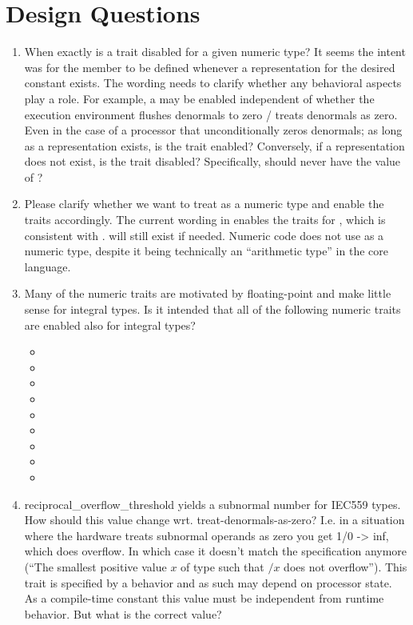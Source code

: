 \section{Design Questions}
\begin{enumerate}
  \item When exactly is a trait disabled for a given numeric type?
  It seems the intent was for the  member to be defined whenever a representation for the desired constant exists.
  The wording needs to clarify whether any behavioral aspects play a role.
  For example, a  may be enabled independent of whether the execution environment flushes denormals to zero / treats denormals as zero.
  Even in the case of a processor that unconditionally zeros denormals; as long as a representation exists, is the trait enabled?
  Conversely, if a representation does not exist, is the trait disabled?
  Specifically,  should never have the value of ?

  \item Please clarify whether we want to treat  as a numeric type and enable the traits accordingly.
  The current wording in \cite{P1841R2} enables the traits for , which is consistent with .
   will still exist if needed.
  Numeric code does not use  as a numeric type, despite it being technically an “arithmetic type” in the core language.

  \item Many of the numeric traits are motivated by floating-point and make little sense for integral types.
  Is it intended that all of the following numeric traits are enabled also for integral types?
  \begin{itemize}
    \item {}
    \item {}
    \item {}
    \item {}
    \item {}
    \item {}
    \item {}
    \item {}
    \item {}
  \end{itemize}

  \item reciprocal_overflow_threshold yields a subnormal number for IEC559 types.
  How should this value change wrt. treat-denormals-as-zero?
  I.e. in a situation where the hardware treats subnormal operands as zero you get 1/0 -> inf, which does overflow.
  In which case it doesn't match the specification anymore (“The smallest positive value $x$ of type  such that $/x$ does not overflow”).
  This trait is specified by a behavior and as such may depend on processor state.
  As a compile-time constant this value must be independent from runtime behavior.
  But what is the correct value?


\end{enumerate}
